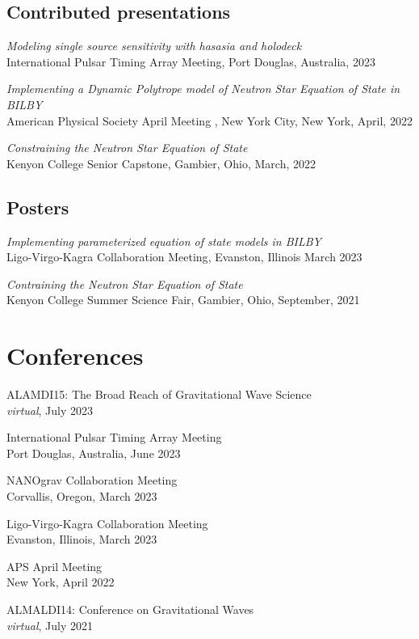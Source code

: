 \documentclass[11pt,letterpaper,sans,unicode]{moderncv}
\newcommand{\confitem}[3]{\item {#1}\\{#2}, #3}
\newcommand{\talkitem}[3]{\item \textit{#1}\\{#2}, #3} %
\newcommand{\confitem}[2]{\item #1 \hfill #2} %
\begin{document}
\subsection{Contributed presentations}
\renewcommand\labelenumi{\bfseries\theenumi .}
\begin{etaremune}[leftmargin=8mm]
\small
\talkitem{Modeling single source sensitivity with hasasia and holodeck}{International Pulsar Timing Array Meeting}{Port Douglas, Australia, 2023}
\talkitem{Implementing a Dynamic Polytrope model of Neutron Star Equation of State in BILBY}{American Physical Society April Meeting }{New York City, New York, April, 2022}
\talkitem{Constraining the Neutron Star Equation of State}{Kenyon College Senior Capstone}{Gambier, Ohio, March, 2022}



\end{etaremune}
\subsection{Posters}
\begin{etaremune}[leftmargin=8mm]
\small
\talkitem{Implementing parameterized equation of state models in BILBY}{Ligo-Virgo-Kagra Collaboration Meeting}{Evanston, Illinois March 2023}
\talkitem{Contraining the Neutron Star Equation of State}{Kenyon College Summer Science Fair}{Gambier, Ohio, September, 2021}
\end{etaremune}



\section{Conferences}
\begin{etaremune}[leftmargin=8mm]
    \confitem{ALAMDI15: The Broad Reach of Gravitational Wave Science}{\textit{virtual}}{July 2023}
    \confitem{International Pulsar Timing Array Meeting}{Port Douglas, Australia}{June 2023}
    \confitem{NANOgrav Collaboration Meeting}{Corvallis, Oregon}{March 2023}
    \confitem{Ligo-Virgo-Kagra Collaboration Meeting}{Evanston, Illinois}{March 2023}
    \confitem{APS April Meeting}{New York}{April 2022}
    \confitem{ALMALDI14: Conference on Gravitational Waves}{\textit{virtual}}{July 2021}
\end{etaremune}
\end{document}
